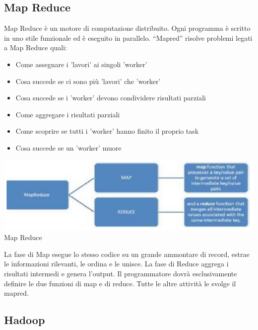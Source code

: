 \documentclass[a4page, 11pt]{article}
\begin{document}
\subsection{Map Reduce}
Map Reduce è un motore di computazione distribuito. Ogni programma è scritto in uno stile funzionale ed è eseguito in parallelo. “Mapred” risolve problemi legati a Map Reduce quali:
\begin{itemize}[noitemsep]
\item Come assegnare i 'lavori' ai singoli 'worker'
\item Cosa succede se ci sono più 'lavori' che 'worker'
\item Cosa succede se i 'worker' devono condividere risultati parziali
\item Come aggregare i risultati parziali
\item Come scoprire se tutti i 'worker' hanno finito il proprio task
\item Cosa succede se un 'worker' muore
\end{itemize}
\begin{center}
	\includegraphics[scale=1]{IMAGE8.png}\\
	Map Reduce
\end{center}
La fase di Map esegue lo stesso codice su un grande ammontare di record, estrae le informazioni rilevanti, le ordina e le unisce. La fase di Reduce aggrega i risultati intermedi e genera l’output. Il programmatore dovrà esclusivamente definire le due funzioni di map e di reduce. Tutte le altre attività le svolge il mapred.
\subsection{Hadoop}
\pagebreak
\printbibliography
\end{document}
